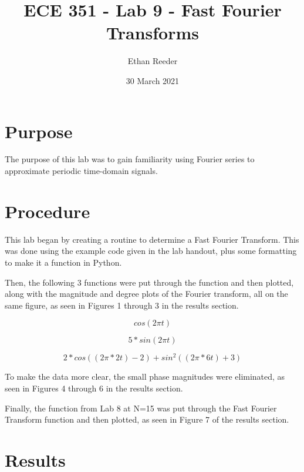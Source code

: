 \documentclass[12pt]{article}
\title{ECE 351 - Lab 9 - Fast Fourier Transforms}
\author{Ethan Reeder}
\date{30 March 2021}
\begin{document}
\lstset{language=Python}

\maketitle

\newpage

\tableofcontents

\newpage

\section{Purpose}

The purpose of this lab was to gain familiarity using Fourier series to approximate periodic time-domain signals.

\section{Procedure}

This lab began by creating a routine to determine a Fast Fourier Transform. This was done using the example code given in the lab handout, plus some formatting to make it a function in Python.

Then, the following 3 functions were put through the function and then plotted, along with the magnitude and degree plots of the Fourier transform, all on the same figure, as seen in Figures 1 through 3 in the results section.

\begin{equation}
    cos(2 \pi t)
\end{equation}

\begin{equation}
    5*sin(2 \pi t)
\end{equation}

\begin{equation}
    2 * cos((2 \pi * 2t) - 2) + sin^2 ((2 \pi * 6t) +3)
\end{equation}

To make the data more clear, the small phase magnitudes were eliminated, as seen in Figures 4 through 6 in the results section.

Finally, the function from Lab 8 at N=15 was put through the Fast Fourier Transform function and then plotted, as seen in Figure 7 of the results section.

\newpage

\section{Results}
\end{document}
